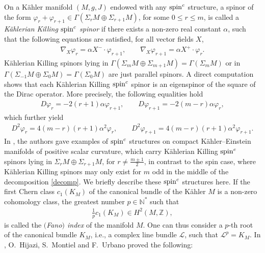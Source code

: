 \documentclass[10pt,a4paper]{amsart}
\numberwithin{equation}{section}
\theoremstyle{definition}
\begin{document}
On a K\"ahler manifold $(M,g,J)$  endowed with any ${\mathop{\rm spin}^c}$ structure,  a spinor of the form $\varphi_r+\varphi_{r+1}\in \Gamma(\Sigma_r M\oplus \Sigma_{r+1} M)$, for some $0\leq r\leq m$, is called a {\it   K\"ahlerian Killing ${\mathop{\rm spin}^c}$ spinor} if  there exists a non-zero real constant $\alpha$, such that the following equations are satisf\/ied, for all vector f\/ields $X$,
 \begin{gather}\label{KKSSdefinition}
   \nabla_X\varphi_r=  \alpha  X^-\cdot\varphi_{r+1},\qquad
   \nabla_X\varphi_{r+1} =  \alpha    X^+\cdot\varphi_{r}.
 \end{gather}
K\"ahlerian Killing spinors lying in $\Gamma(\Sigma_{m} M\oplus \Sigma_{m+1} M) = \Gamma(\Sigma_m M)$  or in  $\Gamma(\Sigma_{-1} M\oplus \Sigma_{0} M) = \Gamma(\Sigma_0 M)$ are just parallel spinors. A direct computation shows that each  K\"ahlerian Killing ${\mathop{\rm spin}^c}$ spinor is an eigenspinor of the square of the Dirac operator. More precisely, the following equalities hold
 \begin{gather}\label{kkseigen1}
   D\varphi_r= -2(r+1)\alpha  \varphi_{r+1},\qquad D\varphi_{r+1}= -2(m-r)\alpha \varphi_{r},
 \end{gather}
which further yield
\begin{gather}\label{kkseigen2}
D^2\varphi_r=4(m-r)(r+1)\alpha^2\varphi_r,\qquad D^2\varphi_{r+1}=4(m-r)(r+1)\alpha^2\varphi_{r+1}.
 \end{gather}
In \cite{hmu}, the authors gave examples of ${\mathop{\rm spin}^c}$ structures on compact K\"ahler--Einstein  manifolds of positive scalar curvature, which carry  K\"ahlerian Killing ${\mathop{\rm spin}^c}$ spinors lying in $\Sigma_r M\oplus \Sigma_{r+1} M$, for $r\neq \frac{m\pm1}{2}$, in contrast to the spin case, where K\"ahlerian Killing spinors may only exist for $m$ odd in the middle of the decomposition \eqref{decomp}. We brief\/ly describe  these ${\mathop{\rm spin}^c}$ structures here. If the f\/irst Chern class $c_1(K_M)$ of the canonical bundle of
the K\"ahler $M$ is a non-zero cohomology class,  the greatest number $p\in \mathbb N^*$ such that
\begin{gather*}
\frac 1p c_1 (K_M) \in H^2 (M, \mathbb Z),
\end{gather*}
is called the {\it $($Fano$)$ index} of the manifold $M$. One can thus consider a $p$-th root of the canonical bundle $K_M$, i.e.,
 a complex line bundle $\mathcal L$, such that $\mathcal L^ p = K_M$. In \cite{hmu}, O.~Hijazi, S.~Montiel and F.~Urbano proved the following:
\end{document}
